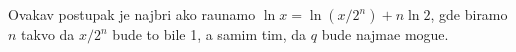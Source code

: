 Ovakav postupak je najbr{\zv}i ako ra{\cv}unamo $\ln x=\ln(x/2^n)+n\ln2$,
gde biramo $n$ takvo da $x/2^n$ bude {\sv}to bil{\zv}e 1, a samim tim, da $q$ bude najma{\nj}e mogu{\cc}e.
